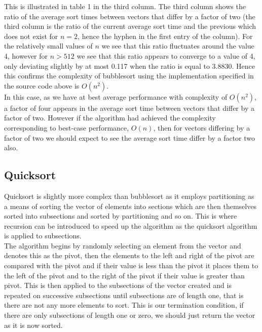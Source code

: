 \documentclass[a4paper, 12pt]{article}
\begin{document}
This is illustrated in table 1 in the third column. The third column shows the ratio of the average sort times between vectors that differ by a factor of two (the third column is the ratio of the current average sort time and the previous which does not exist for $n=2$, hence the hyphen in the first entry of the column). For the relatively small values of $n$ we see that this ratio fluctuates around the value 4, however for $n>512$ we see that this ratio appears to converge to a value of 4, only deviating slightly by at most 0.117 when the ratio is equal to 3.8830. Hence this confirms the complexity of bubblesort using the implementation specified in the source code above is $O(n^2)$.\\

In this case, as we have at best average performance with complexity of $O(n^2)$, a factor of four appears in the average sort time between vectors that differ by a factor of two. However if the algorithm had achieved the complexity corresponding to best-case performance, $O(n)$, then for vectors differing by a factor of two we should expect to see the average sort time differ by a factor two also.     


\subsection{Quicksort}

Quicksort is slightly more complex than bubblesort as it employs partitioning as a means of sorting the vector of elements into sections which are then themselves sorted into subsections and sorted by partitioning and so on. This is where recursion can be introduced to speed up the algorithm as the quicksort algorithm is applied to subsections.\\ 

The algorithm begins by randomly selecting an element from the vector and denotes this as the pivot, then the elements to the left and right of the pivot are compared with the pivot and if their value is less than the pivot it places them to the left of the pivot and to the right of the pivot if their value is greater than pivot. This is then applied to the subsections of the vector created and is repeated on successive subsections until subsections are of length one, that is there are not any more elements to sort. This is our termination condition, if there are only subsections of length one or zero, we should just return the vector as it is now sorted. 
    
\end{document}
